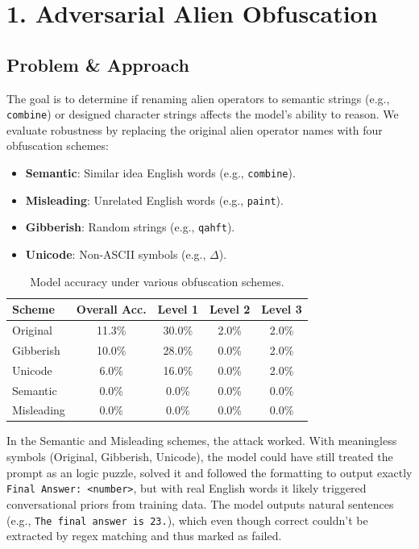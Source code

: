 \section*{1. Adversarial Alien Obfuscation}

\subsection*{Problem \& Approach}
The goal is to determine if renaming alien operators to semantic strings (e.g., \texttt{combine}) or designed character strings affects the model's ability to reason. We evaluate robustness by replacing the original alien operator names with four obfuscation schemes:
\begin{itemize}
    \item \textbf{Semantic}: Similar idea English words (e.g., \texttt{combine}).
    \item \textbf{Misleading}: Unrelated English words (e.g., \texttt{paint}).
    \item \textbf{Gibberish}: Random strings (e.g., \texttt{qahft}).
    \item \textbf{Unicode}: Non-ASCII symbols (e.g., $\Delta$).
\end{itemize}

\begin{table}[h]
\centering
\begin{tabular}{l c c c c}
\toprule
\textbf{Scheme} & \textbf{Overall Acc.} & \textbf{Level 1} & \textbf{Level 2} & \textbf{Level 3} \\
\midrule
Original & 11.3\% & 30.0\% & 2.0\% & 2.0\% \\
Gibberish & 10.0\% & 28.0\% & 0.0\% & 2.0\% \\
Unicode & 6.0\% & 16.0\% & 0.0\% & 2.0\% \\
Semantic & 0.0\% & 0.0\% & 0.0\% & 0.0\% \\
Misleading & 0.0\% & 0.0\% & 0.0\% & 0.0\% \\
\bottomrule
\end{tabular}
\caption{Model accuracy under various obfuscation schemes.}
\label{tab:obfuscation_results}
\end{table}

In the Semantic and Misleading schemes, the attack worked.
With meaningless symbols (Original, Gibberish, Unicode), the model could have still treated the prompt as an logic puzzle, solved it and followed the formatting to output exactly \texttt{Final Answer: <number>}, but with real English words it likely triggered conversational priors from training data. The model outputs natural sentences (e.g., \texttt{The final answer is 23.}), which even though correct couldn't be extracted by regex matching and thus marked as failed. 
